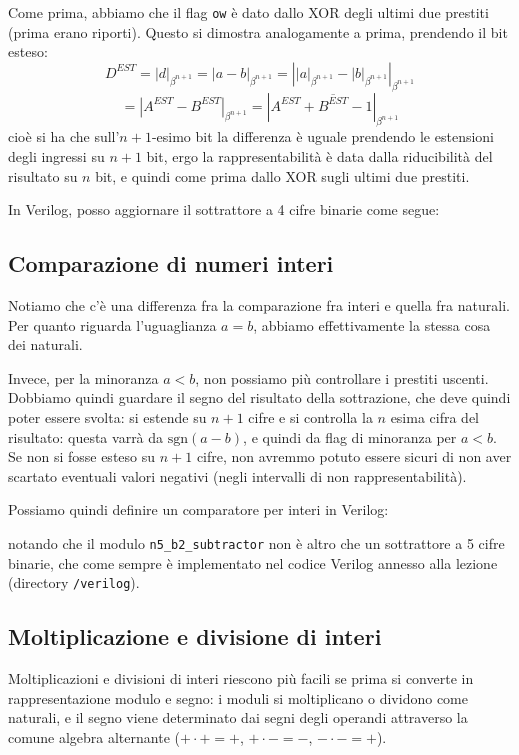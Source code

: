 \documentclass[a4paper,11pt]{article}
\begin{document}
Come prima, abbiamo che il flag \lstinline|ow| è dato dallo XOR degli ultimi due prestiti (prima erano riporti).
Questo si dimostra analogamente a prima, prendendo il bit esteso:
$$
D^{EST} = |d|_{\beta^{n+1}} = |a-b|_{\beta^{n+1}} = \left| |a|_{\beta^{n+1}} - |b|_{\beta^{n+1}} \right|_{\beta^{n+1}} 
$$
$$
= |A^{EST} - B^{EST}|_{\beta^{n+1}} = |A^{EST} + \overline{B^{EST}} -1|_{\beta^{n+1}}
$$
cioè si ha che sull'$n+1$-esimo bit la differenza è uguale prendendo le estensioni degli ingressi su $n+1$ bit, ergo la rappresentabilità è data dalla riducibilità del risultato su $n$ bit, e quindi come prima dallo XOR sugli ultimi due prestiti.

In Verilog, posso aggiornare il sottrattore a 4 cifre binarie come segue:



\subsection{Comparazione di numeri interi}
Notiamo che c'è una differenza fra la comparazione fra interi e quella fra naturali.
Per quanto riguarda l'uguaglianza $a = b$, abbiamo effettivamente la stessa cosa dei naturali.

Invece, per la minoranza $a < b$, non possiamo più controllare i prestiti uscenti.
Dobbiamo quindi guardare il segno del risultato della sottrazione, che deve quindi poter essere svolta: si estende su $n+1$ cifre e si controlla la $n$ esima cifra del risultato: questa varrà da $\mathrm{sgn}(a-b)$, e quindi da flag di minoranza per $a < b$.
Se non si fosse esteso su $n+1$ cifre, non avremmo potuto essere sicuri di non aver scartato eventuali valori negativi (negli intervalli di non rappresentabilità).

Possiamo quindi definire un comparatore per interi in Verilog:



notando che il modulo \lstinline|n5_b2_subtractor| non è altro che un sottrattore a 5 cifre binarie, che come sempre è implementato nel codice Verilog annesso alla lezione (directory \lstinline|/verilog|).

\subsection{Moltiplicazione e divisione di interi}
Moltiplicazioni e divisioni di interi riescono più facili se prima si converte in rappresentazione modulo e segno: i moduli si moltiplicano o dividono come naturali, e il segno viene determinato dai segni degli operandi attraverso la comune algebra alternante ($+ \cdot + = +$, $+ \cdot - = -$, $- \cdot - = +$).
\end{document}
